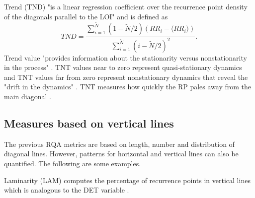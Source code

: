 Trend (TND) "is a linear regression coefficient over the
recurrence point density of the diagonals parallel to the LOI" \cite{marwan2015} 
and is defined as
\begin{equation}
TND= \frac{ \sum^{\tilde{N} }_{i=1}  (1- \tilde{N} /2 )( RR_i - \langle RR_i  \rangle )  }{  \sum^{\tilde{N} }_{i=1}  (i-\tilde{N} /2)^2  }.
\end{equation}
Trend value "provides information about the stationarity versus nonstationarity 
in the process" \cite{marwan2015}.
TNT values near to zero represent quasi-stationary dynamics and TNT values far from zero
represent nonstationary dynamics that reveal the "drift in the dynamics" \cite{marwan2015}.
TNT measures how quickly the RP pales away from the main diagonal \cite{iwanski1998}.
%  


\subsection{Measures based on vertical lines}
The previous RQA metrics are based on length, number and distribution of diagonal lines. 
However, patterns for horizontal and vertical lines 
can also be quantified. The following are some examples.

Laminarity (LAM) computes the percentage of recurrence points in vertical lines
which is analogous to the DET variable \cite{marwan2015}.
 
